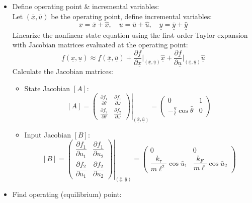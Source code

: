 ﻿\documentclass[12pt]{article}
\begin{document}
\begin{itemize}
    \item[I.] Define operating point \& incremental variables:\\
    Let $(\underline{\bar{x}}, \underline{\bar{u}})$ be the operating point, define incremental variables:
    \[\underline{x} = \underline{\bar{x}} + \underline{\hat{x}},\quad \underline{u} = \underline{\bar{u}} + \underline{\hat{u}},\quad \underline{y} = \underline{\bar{y}} + \underline{\hat{y}}\]
    Linearize the nonlinear state equation using the first order Taylor expansion with Jacobian matrices evaluated at the operating point:
    \[\underline{f}(\underline{x},\underline{u}) \approx \underline{f}(\underline{\bar{x}}, \underline{\bar{u}}) + \frac{\partial \underline{f}}{\partial \underline{x}}\bigg|_{(\underline{\bar{x}}, \underline{\bar{u}})} \underline{\hat{x}} + \frac{\partial \underline{f}}{\partial \underline{u}}\bigg|_{(\underline{\bar{x}}, \underline{\bar{u}})} \underline{\hat{u}}\]
    Calculate the Jacobian matrices:
    \begin{itemize}
        \item State Jacobian $[A]$:
        \[\renewcommand{\arraystretch}{1.8}
        [A] = \left.\begin{pmatrix}
\frac{\partial f_1}{\partial \theta} & \frac{\partial f_1}{\partial \omega} \\
\frac{\partial f_2}{\partial \theta} & \frac{\partial f_2}{\partial \omega}
\end{pmatrix}\right|_{(\underline{\bar{x}}, \underline{\bar{u}})}=
\begin{pmatrix}
0 & 1 \\
-\frac{g}{\ell}\cos\bar{\theta} & 0
\end{pmatrix}\]
        \item Input Jacobian $[B]$:
\[
\renewcommand{\arraystretch}{1.8}
[B] =
\left.
\begin{pmatrix}
\dfrac{\partial f_1}{\partial u_1} & \dfrac{\partial f_1}{\partial u_2} \\
\dfrac{\partial f_2}{\partial u_1} & \dfrac{\partial f_2}{\partial u_2}
\end{pmatrix}
\right|_{(\underline{\bar{x}}, \underline{\bar{u}})} =
\begin{pmatrix}
0 & 0 \\
\dfrac{k_{\tau}}{m\ell^2}\cos\bar{u}_1 &
\dfrac{k_F}{m\ell}\cos\bar{u}_2
\end{pmatrix}\]
    \end{itemize}
    \item [II.] Find operating (equilibrium) point:\\

\end{itemize}
\end{document}
